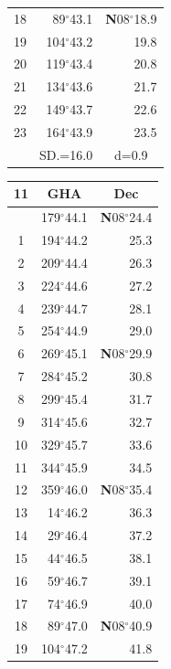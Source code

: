\documentclass[10pt, a4paper]{report}
\begin{document}
\begin{scriptsize}
\begin{tabular*}{0.2\textwidth}[t]{@{\extracolsep{\fill}}|c|rr|}
18 & 89$^\circ$43.1 & \textbf{N}08$^\circ$18.9\\
19 & 104$^\circ$43.2 & 19.8\\
20 & 119$^\circ$43.4 & 20.8\\
21 & 134$^\circ$43.6 & \raisebox{0.24ex}{\boldmath$\cdot$~\boldmath$\cdot$~~}21.7\\
22 & 149$^\circ$43.7 & 22.6\\
23 & 164$^\circ$43.9 & 23.5\\
\hline
\rule{0pt}{2.4ex} & \multicolumn{1}{c}{SD.=16.0} & \multicolumn{1}{c|}{d=0.9}\\
\hline
\end{tabular*}\noindent
\begin{tabular*}{0.2\textwidth}[t]{@{\extracolsep{\fill}}|c|rr|}
\hline
\multicolumn{1}{|c|}{\rule{0pt}{2.6ex}\textbf{11}} & \multicolumn{1}{c}{\textbf{GHA}} & \multicolumn{1}{c|}{\textbf{Dec}}\\
\hline\rule{0pt}{2.6ex}\noindent
0 & 179$^\circ$44.1 & \textbf{N}08$^\circ$24.4\\
1 & 194$^\circ$44.2 & 25.3\\
2 & 209$^\circ$44.4 & 26.3\\
3 & 224$^\circ$44.6 & \raisebox{0.24ex}{\boldmath$\cdot$~\boldmath$\cdot$~~}27.2\\
4 & 239$^\circ$44.7 & 28.1\\
5 & 254$^\circ$44.9 & 29.0\\[2Pt]
6 & 269$^\circ$45.1 & \textbf{N}08$^\circ$29.9\\
7 & 284$^\circ$45.2 & 30.8\\
8 & 299$^\circ$45.4 & 31.7\\
9 & 314$^\circ$45.6 & \raisebox{0.24ex}{\boldmath$\cdot$~\boldmath$\cdot$~~}32.7\\
10 & 329$^\circ$45.7 & 33.6\\
11 & 344$^\circ$45.9 & 34.5\\[2Pt]
12 & 359$^\circ$46.0 & \textbf{N}08$^\circ$35.4\\
13 & 14$^\circ$46.2 & 36.3\\
14 & 29$^\circ$46.4 & 37.2\\
15 & 44$^\circ$46.5 & \raisebox{0.24ex}{\boldmath$\cdot$~\boldmath$\cdot$~~}38.1\\
16 & 59$^\circ$46.7 & 39.1\\
17 & 74$^\circ$46.9 & 40.0\\[2Pt]
18 & 89$^\circ$47.0 & \textbf{N}08$^\circ$40.9\\
19 & 104$^\circ$47.2 & 41.8\\

\end{tabular*}
\end{scriptsize}
\end{document}
